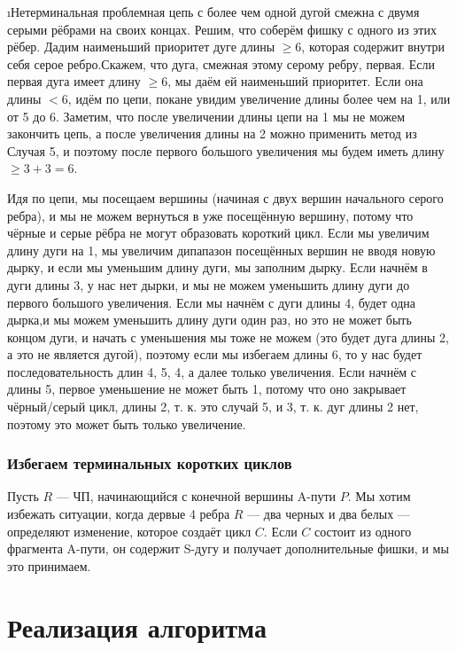 \begin{proofstar}
\begin{enumerate}
\i Нетерминальная проблемная цепь с более чем одной дугой смежна с двумя серыми рёбрами на своих концах. Решим, что соберём фишку с одного из этих рёбер. Дадим наименьший приоритет дуге длины $\ge 6$, которая содержит внутри себя серое ребро.Скажем, что дуга, смежная этому серому ребру, первая. Если первая дуга имеет длину $\ge 6$, мы даём ей наименьший приоритет. Если она длины $< 6$, идём по цепи, покане увидим увеличение длины более чем на 1, или от 5 до 6. Заметим, что после увеличении длины цепи на 1 мы не можем закончить цепь, а после увеличения длины на 2 можно применить метод из Случая 5, и поэтому после первого большого увеличения мы будем иметь длину $\ge 3+3=6$. 
\end{enumerate}

Идя по цепи, мы посещаем вершины (начиная с двух вершин начального серого ребра), и мы не можем вернуться в уже посещённую вершину, потому что чёрные и серые рёбра не могут образовать короткий цикл. Если мы увеличим длину дуги на 1, мы увеличим дипапазон посещённых вершин не вводя новую дырку, и если мы уменьшим длину дуги, мы заполним дырку. Если начнём в дуги длины 3, у нас нет дырки, и мы не можем уменьшить длину дуги до первого большого увеличения. Если мы начнём с дуги длины 4, будет одна дырка,и мы можем уменьшить длину дуги один раз, но это не может быть концом дуги, и начать с уменьшения мы тоже не можем (это будет дуга длины 2, а это не является дугой), поэтому если мы избегаем длины 6, то у нас будет последовательность длин 4, 5, 4, а далее только увеличения. Если начнём с длины 5, первое уменьшение не может быть 1, потому что оно закрывает чёрный/серый цикл, длины 2, т. к. это случай 5, и 3, т. к. дуг длины 2 нет, поэтому это может быть только увеличение.

\subsubsection{Избегаем терминальных коротких циклов}
Пусть $R$ --- ЧП, начинающийся с конечной вершины A-пути $P$. Мы хотим избежать ситуации, когда дервые 4 ребра $R$ --- два черных и два белых --- определяют изменение, которое создаёт цикл $C$. Если $C$ состоит из одного фрагмента A-пути, он содержит S-дугу и получает дополнительные фишки, и мы это принимаем.
\end{proofstar}

\section{Реализация алгоритма}

